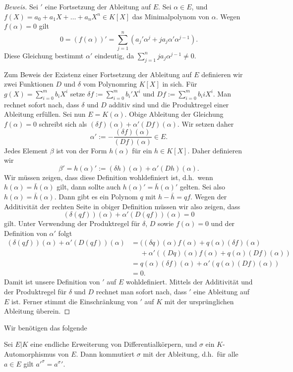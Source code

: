 \documentclass[12pt,a4paper,twoside]{article}
\begin{document}
\begin{proof}[Beweis]
  Sei $'$ eine Fortsetzung der Ableitung auf $E$. Sei $\alpha\in E$, und
  $f(X)=a_0+a_1X+\dots+a_nX^n\in K[X]$ das Minimalpolynom von $\alpha$. Wegen
  $f(\alpha)=0$ gilt
\[
0=(f(\alpha))'=\sum_{j=1}^n(a_j'\alpha^j+ja_j\alpha'\alpha^{j-1}).
\]
Diese Gleichung bestimmt $\alpha'$ eindeutig, da
$\sum_{j=1}^nja_j\alpha^{j-1}\ne0$.

Zum Beweis der Existenz einer Fortsetzung der Ableitung auf $E$ definieren wir
zwei Funktionen $D$ und $\delta$ vom Polynomring $K[X]$ in sich. F\"ur
$g(X)=\sum_{i=0}^mb_iX^i$ setze $\delta f:=\sum_{i=0}^mb_i'X^i$ und
$Df:=\sum_{i=0}^mb_iiX^i$. Man rechnet sofort nach, dass $\delta$ und $D$
additiv sind und die Produktregel einer Ableitung erf\"ullen. Sei nun
$E=K(\alpha)$. Obige Ableitung der Gleichung $f(\alpha)=0$ schreibt sich als
$(\delta f)(\alpha)+\alpha'(Df)(\alpha)$. Wir setzen daher
\[
\alpha':=-\frac{(\delta f)(\alpha)}{(Df)(\alpha)}\in E.
\]
Jedes Element $\beta$ ist von der Form $h(\alpha)$ f\"ur ein $h\in K[X]$.
Daher definieren wir
\[
\beta'=h(\alpha)':=(\delta h)(\alpha)+\alpha'(Dh)(\alpha).
\]
Wir m\"ussen zeigen, dass diese Definition wohldefiniert ist, d.h.\ wenn
$h(\alpha)=\bar h(\alpha)$ gilt, dann sollte auch $h(\alpha)'=\bar h(\alpha)'$
gelten. Sei also $h(\alpha)=\bar h(\alpha)$. Dann gibt es ein Polynom $q$ mit
$h-\bar h=qf$. Wegen der Additivit\"at der rechten Seite in obiger Definition
m\"ussen wir also zeigen, dass
\[
(\delta(qf))(\alpha)+\alpha'(D(qf))(\alpha)=0
\]
gilt. Unter Verwendung der Produktregel f\"ur $\delta$, $D$ sowie
$f(\alpha)=0$ und der Definition von $\alpha'$ folgt
\begin{align*}
  (\delta(qf))(\alpha)+\alpha'(D(qf))(\alpha) &=
((\delta q)(\alpha)f(\alpha)+q(\alpha)(\delta f)(\alpha)\\
&\mathrel{\phantom{=}} {}+\alpha'((D q)(\alpha)f(\alpha)+q(\alpha)(D
f)(\alpha))\\
&= q(\alpha)(\delta f)(\alpha)+\alpha'(q(\alpha)(D f)(\alpha))\\
&= 0.
\end{align*}
Damit ist unsere Definition von $'$ auf $E$ wohldefiniert. Mittels der
Additivit\"at und der Produktregel f\"ur $\delta$ und $D$ rechnet man sofort
nach, dass $'$ eine Ableitung auf $E$ ist. Ferner stimmt die Einschr\"ankung
von $'$ auf $K$ mit der urspr\"unglichen Ableitung \"uberein.
\end{proof}
Wir ben\"otigen das folgende
\begin{Korollar}\label{K:diffgal}
  Sei $E|K$ eine endliche Erweiterung von Differentialk\"orpern, und $\sigma$
  ein $K$-Automorphismus von $E$. Dann kommutiert $\sigma$ mit der Ableitung,
  d.h.\ f\"ur alle $a\in E$ gilt ${a'}^\sigma={a^\sigma}'$.
\end{Korollar}
\end{document}
